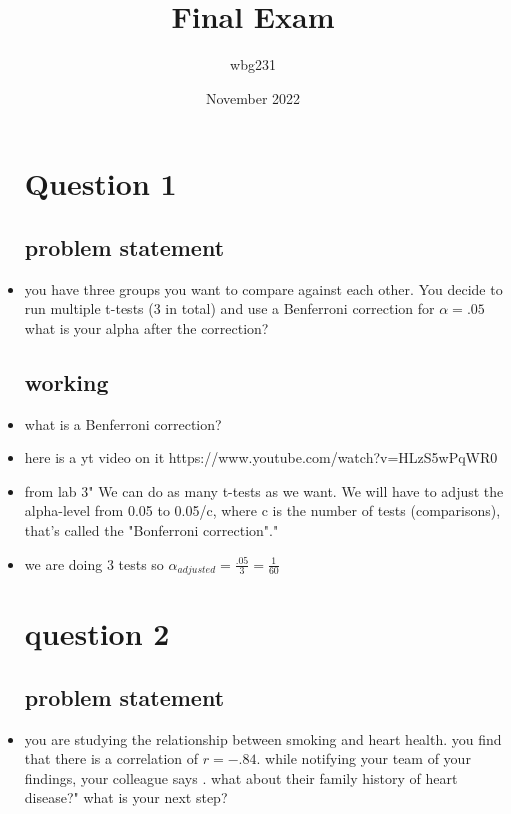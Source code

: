 \documentclass{article}
\title{Final Exam }
\author{wbg231 }
\date{November 2022}
\begin{document}
\begin{itemize}
\maketitle
\section{Question 1}

\subsection{problem statement}
\item you have three groups you want to compare against each other. You decide to run multiple t-tests (3 in total) and use a Benferroni correction for $\alpha=.05$ what is your alpha after the correction?

\subsection{working}
\item what is a Benferroni correction? 
\item here is a yt video on it https://www.youtube.com/watch?v=HLzS5wPqWR0
\item from lab 3" We can do as many t-tests as we want. We will have to adjust the alpha-level from 0.05 to 0.05/c, where c is the number of tests (comparisons), that's called the "Bonferroni correction"."
\item we are doing 3 tests so $\alpha_{adjusted}=\frac{.05}{3}=\frac{1}{60}$

\section{question 2}
\subsection{problem statement}
\item you are studying the relationship between smoking and heart health. you find that there is a correlation of $r=-.84$. while notifying your team of your findings, your colleague says .
what about their family history of heart disease?" what is your next step?

\end{itemize}
\end{document}
